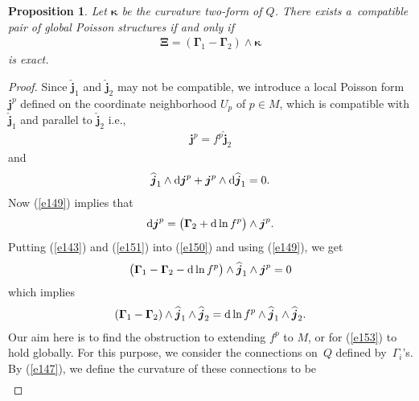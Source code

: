 \documentclass[pdftex]{sigma}
\numberwithin{equation}{section}
\newtheorem{Proposition}[Theorem]{Proposition}
 { \theoremstyle{definition}
\newtheorem{Definition}[Theorem]{Definition} }
\begin{document}
\begin{Proposition}\label{proposition6}
Let $\boldsymbol{\kappa }$ be the curvature two-form of $Q$. There exists a~compatible pair of global Poisson structures if and only if
\begin{gather*}
\boldsymbol{\Xi }= ( \boldsymbol{\Gamma }_{1}-\boldsymbol{\Gamma }_{2} ) \wedge \boldsymbol{\kappa } \label{e148}
\end{gather*}
is exact.
\end{Proposition}

\begin{proof}
Since $\widehat{\boldsymbol{j}}_{1}$ and $\widehat{\boldsymbol{j}}_{2}$ may not be compatible, we introduce a local Poisson form $\boldsymbol{j}^{p}$ def\/ined on the coordinate neighborhood $U_{p}$ of $p\in M$, which is compatible with $\widehat{\boldsymbol{j}}_{1}$ and parallel to $\widehat{\boldsymbol{j}}_{2}$ i.e.,
\begin{gather}
\boldsymbol{j}^{p}=f^{p}\widehat{\boldsymbol{j}}_{2} \label{e149}
\end{gather}
and
\begin{gather}
\widehat{\boldsymbol{j}}_{1}\wedge {\rm d}\boldsymbol{j}^{p}+\boldsymbol{j}^{p}\wedge {\rm d}\widehat{\boldsymbol{j}}_{1}=0. \label{e150}
\end{gather}
Now (\ref{e149}) implies that
\begin{gather}
{\rm d}\boldsymbol{j}^{p}=\big( \boldsymbol{\Gamma }_{2}+{\rm d}\ln f^{p}\big) \wedge \boldsymbol{j}^{p}. \label{e151}
\end{gather}
Putting (\ref{e143}) and (\ref{e151}) into (\ref{e150}) and using (\ref{e149}), we get
\begin{gather*}
\big( \boldsymbol{\Gamma }_{1}-\boldsymbol{\Gamma }_{2}-{\rm d}\ln f^{p}\big) \wedge \widehat{\boldsymbol{j}}_{1}\wedge \boldsymbol{j}^{p}=0
\end{gather*}
which implies
\begin{gather}
 ( \boldsymbol{\Gamma }_{1}-\boldsymbol{\Gamma }_{2} ) \wedge \widehat{\boldsymbol{j}}_{1}\wedge \widehat{\boldsymbol{j}}_{2}={\rm d}\ln f^{p}\wedge \widehat{\boldsymbol{j}}_{1}\wedge \widehat{\boldsymbol{j}}_{2}. \label{e153}
\end{gather}
Our aim here is to f\/ind the obstruction to extending $f^{p}$ to $M$, or for (\ref{e153}) to hold globally. For this purpose, we consider the connections on~$Q$ def\/ined by~$\Gamma _{i}$'s. By (\ref{e147}), we def\/ine the curvature of these connections to be
\begin{gather*}

\end{gather*}
\end{proof}
\end{document}

